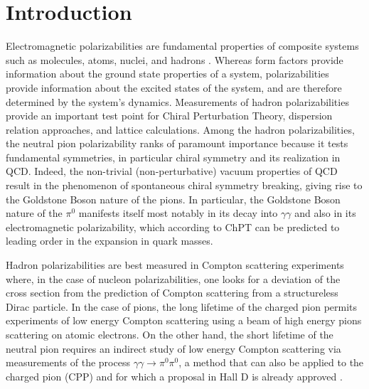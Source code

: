 \section{Introduction}

Electromagnetic polarizabilities are fundamental properties of
composite systems such as molecules, atoms, nuclei, and hadrons
\cite{Holstein:1990qy}. Whereas { form factors} provide information
about the ground state properties of a system, polarizabilities
provide information about the excited states of the system, { and are
  therefore determined by the system's dynamics}.
Measurements of hadron polarizabilities provide an important test
point for Chiral Perturbation Theory, dispersion relation approaches,
and lattice calculations. Among the hadron polarizabilities, the
neutral pion polarizability ranks of paramount importance because it
tests fundamental symmetries, in particular chiral symmetry and its
realization in QCD.  Indeed, the non-trivial (non-perturbative) vacuum
properties of QCD result in the phenomenon of spontaneous chiral
symmetry breaking, giving rise to the Goldstone Boson nature of the
pions.  In particular, the Goldstone Boson nature of the $\pi^0$
manifests itself most notably in its decay into $\gamma\gamma$ and
also in its electromagnetic polarizability, which according to ChPT
can be predicted to leading order in the expansion in quark
masses.


Hadron polarizabilities are best measured in Compton scattering
experiments where, in the case of nucleon polarizabilities, one looks
for a deviation of the cross section from the prediction of Compton
scattering from a structureless Dirac particle.
In the case of pions, the long lifetime of the charged pion permits
experiments of low energy Compton scattering using a beam of high
energy pions scattering on atomic electrons. On the other hand, the
short lifetime of the neutral pion requires an indirect study of low
energy Compton scattering via measurements of the process $\gamma
\gamma \rightarrow \pi^0 \pi^0$, a method that can also be applied to
the charged pion (CPP) and for which a proposal in Hall D is already
approved \cite{CPPexp}.


